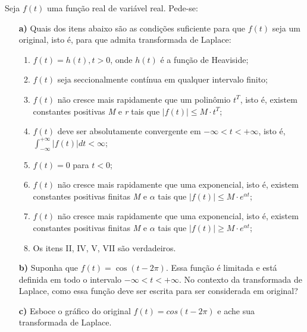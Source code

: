 \linespread{1.5}
Seja $f(t)$ uma função real de variável real. Pede-se:
\begin{itemize}
    \item[\textbf{a)}] Quais dos itens abaixo são as condições suficiente para que $f(t)$ seja um original, isto é, para que admita transformada de Laplace:
    \begin{enumerate}[I]
        \item $f(t) = h(t), t>0$, onde $h(t)$ é a função de Heaviside;
        \item $f(t)$ seja seccionalmente contínua em qualquer intervalo finito;
        \item $f(t)$ não cresce mais rapidamente que um polinômio $t^T$, isto é, existem constantes positivas \textit{M} e \textit{r} tais que $|f(t)| \leq M\cdot t^T$;
        \item $f(t)$ deve ser absolutamente convergente em $-\infty < t < +\infty$, isto é, $\int_{-\infty}^{+\infty}|f(t)|dt < \infty$;
        \item $f(t) = 0$ para $t<0$;
        \item $f(t)$ não cresce mais rapidamente que uma exponencial, isto é, existem constantes positivas finitas \textit{M} e $\alpha$ tais que $|f(t)| \leq M\cdot e^{\alpha t}$;
        \item $f(t)$ não cresce mais rapidamente que uma exponencial, isto é, existem constantes positivas finitas \textit{M} e $\alpha$ tais que $|f(t)| \geq M\cdot e^{\alpha t}$;
        \item Os itens II, IV, V, VII são verdadeiros.
    \end{enumerate}
    \item[\textbf{b)}] Suponha que $f(t) = \cos{(t-2\pi)}$. Essa função é limitada e está definida em todo o intervalo $-\infty < t < +\infty$. No contexto da transformada de Laplace, como essa função deve ser escrita para ser considerada em original?
    \item[\textbf{c)}] Esboce o gráfico do original $f(t) = cos(t-2\pi)$ e ache sua transformada de Laplace.
\end{itemize}